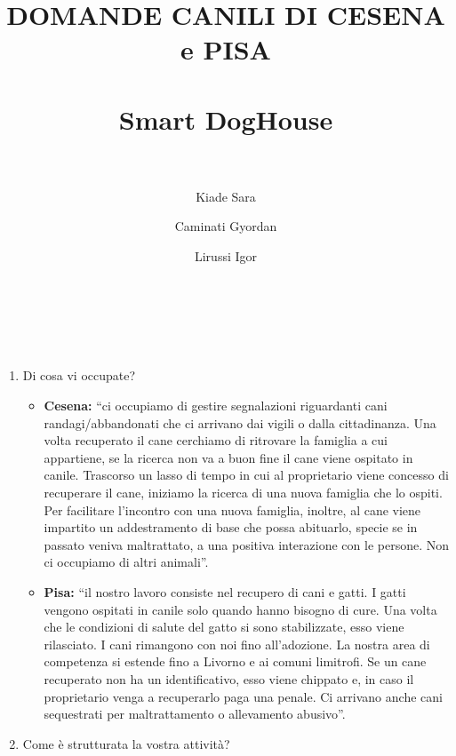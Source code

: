 \documentclass{report}
\title{\LARGE
        DOMANDE CANILI DI CESENA e PISA  \\
        \hrulefill \\
        Smart DogHouse \\
        \hrulefill \\
    }
\author{
        Kiade Sara \\ \emailaddr{sara.kiade@studio.unibo.it}
        \and 
        Caminati Gyordan \\ \emailaddr{gyordan.caminati@studio.unibo.it} 
        \and
        Lirussi Igor \\ \emailaddr{igor.lirussi@studio.unibo.it}
        \\ \\ \\ 
    }
\begin{document}
\maketitle


\begin{enumerate}
\def\labelenumi{\arabic{enumi}.}
\item
  Di cosa vi occupate?

  \begin{itemize}
  \tightlist
  \item
    \textbf{Cesena:} ``ci occupiamo di gestire segnalazioni riguardanti
    cani randagi/abbandonati che ci arrivano dai vigili o dalla
    cittadinanza. Una volta recuperato il cane cerchiamo di ritrovare la
    famiglia a cui appartiene, se la ricerca non va a buon fine il cane
    viene ospitato in canile. Trascorso un lasso di tempo in cui al
    proprietario viene concesso di recuperare il cane, iniziamo la
    ricerca di una nuova famiglia che lo ospiti. Per facilitare
    l'incontro con una nuova famiglia, inoltre, al cane viene impartito
    un addestramento di base che possa abituarlo, specie se in passato
    veniva maltrattato, a una positiva interazione con le persone. Non
    ci occupiamo di altri animali''.
  \item
    \textbf{Pisa: }``il nostro lavoro consiste nel recupero di cani e
    gatti. I gatti vengono ospitati in canile solo quando hanno bisogno
    di cure. Una volta che le condizioni di salute del gatto si sono
    stabilizzate, esso viene rilasciato. I cani rimangono con noi fino
    all'adozione. La nostra area di competenza si estende fino a Livorno
    e ai comuni limitrofi. Se un cane recuperato non ha un
    identificativo, esso viene chippato e, in caso il proprietario venga
    a recuperarlo paga una penale. Ci arrivano anche cani sequestrati
    per maltrattamento o allevamento abusivo''.
  \end{itemize}
\item
  Come è strutturata la vostra attività?


\end{enumerate}
\end{document}
